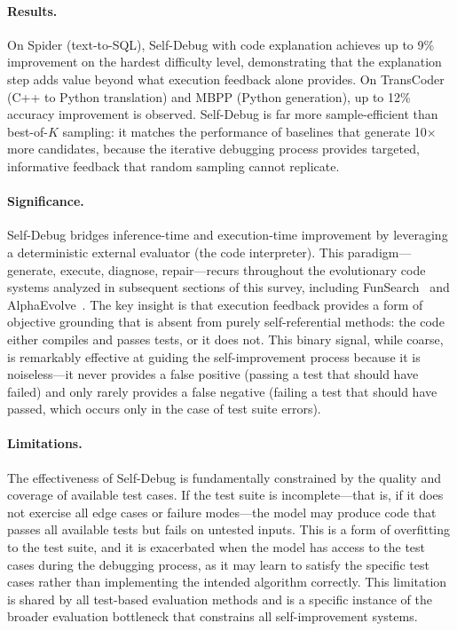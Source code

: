 \paragraph{Results.}
On Spider (text-to-SQL), Self-Debug with code explanation achieves up to 9\% improvement on the hardest difficulty level, demonstrating that the explanation step adds value beyond what execution feedback alone provides. On TransCoder (C++ to Python translation) and MBPP (Python generation), up to 12\% accuracy improvement is observed. Self-Debug is far more sample-efficient than best-of-$K$ sampling: it matches the performance of baselines that generate 10$\times$ more candidates, because the iterative debugging process provides targeted, informative feedback that random sampling cannot replicate.

\paragraph{Significance.}
Self-Debug bridges inference-time and execution-time improvement by leveraging a deterministic external evaluator (the code interpreter). This paradigm---generate, execute, diagnose, repair---recurs throughout the evolutionary code systems analyzed in subsequent sections of this survey, including FunSearch~\citep{chen2024funsearch} and AlphaEvolve~\citep{novikov2025alphaevolve}. The key insight is that execution feedback provides a form of objective grounding that is absent from purely self-referential methods: the code either compiles and passes tests, or it does not. This binary signal, while coarse, is remarkably effective at guiding the self-improvement process because it is noiseless---it never provides a false positive (passing a test that should have failed) and only rarely provides a false negative (failing a test that should have passed, which occurs only in the case of test suite errors).

\paragraph{Limitations.}
The effectiveness of Self-Debug is fundamentally constrained by the quality and coverage of available test cases. If the test suite is incomplete---that is, if it does not exercise all edge cases or failure modes---the model may produce code that passes all available tests but fails on untested inputs. This is a form of overfitting to the test suite, and it is exacerbated when the model has access to the test cases during the debugging process, as it may learn to satisfy the specific test cases rather than implementing the intended algorithm correctly. This limitation is shared by all test-based evaluation methods and is a specific instance of the broader evaluation bottleneck that constrains all self-improvement systems.

